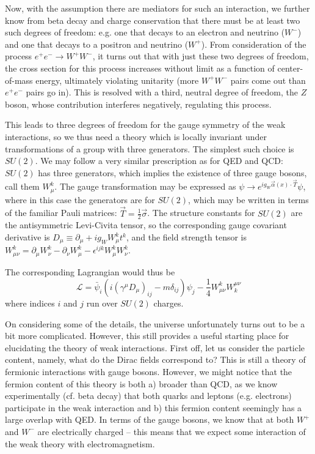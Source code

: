 Now, with the assumption there are mediators for such an interaction, we further know from beta decay and 
charge conservation that there must be at least two such degrees of freedom: e.g. one that decays to an electron 
and neutrino ($W^{-}$) and one that decays to a positron and neutrino ($W^{+}$). From consideration of the process 
$e^{+}e^{-}\rightarrow W^{+}W^{-}$, it turns out that with just these two degrees of freedom, the cross section for this process increases without limit as a function of center-of-mass energy, ultimately violating unitarity (more $W^{+}W^{-}$ 
pairs come out than $e^{+}e^{-}$ pairs go in). This is resolved with a third, neutral degree of freedom, the $Z$
boson, whose contribution interferes negatively, regulating this process.

This leads to three degrees of freedom for the gauge symmetry of the weak interactions, so we thus need a theory 
which is locally invariant under transformations of a group with three generators. The simplest such choice is $SU(2)$. 
We may follow a very similar prescription as for QED and QCD: $SU(2)$ has three generators, which implies the existence of 
three gauge bosons, call them $W_{\mu}^k$.  The gauge transformation may be expressed as $\psi \rightarrow e^{ig_{W}\vec{\alpha}(x)\cdot \vec{T}}\psi$, where in this case the generators are for $SU(2)$, which may be written in terms of the familiar
Pauli matrices: $\vec{T} = \frac{1}{2}\vec{\sigma}$. The structure constants for $SU(2)$ are the antisymmetric Levi-Civita 
tensor, so the corresponding gauge covariant derivative is
$D_{\mu} \equiv \partial_{\mu} + ig_{W}W_{\mu}^{k}t^{k}$, and the field strength tensor is 
$W_{\mu\nu}^{k} = \partial_{\mu}W_{\nu}^{k}-\partial_{\nu}W_{\mu}^{k}-\epsilon^{ijk}W_{\mu}^{k}W_{\nu}^{k}$.

The corresponding Lagrangian would thus be
\begin{equation}
\mathcal{L} = \bar{\psi}_{i}(i(\gamma^{\mu}D_{\mu})_{ij} - m\delta_{ij})\psi_{j} -\frac{1}{4} W_{\mu\nu}^{k}W^{\mu\nu}_{k}
\end{equation}
where indices $i$ and $j$ run over $SU(2)$ charges.

On considering some of the details, the universe unfortunately turns out to be a bit more complicated. However, this still
provides a useful starting place for elucidating the theory of weak interactions. First off, let us consider the 
particle content, namely, what do the Dirac fields correspond to? This is still a theory of fermionic interactions
with gauge bosons. However, we might notice that the fermion content of this theory is both a) broader than QCD, 
as we know experimentally (cf. beta decay) that both quarks and leptons (e.g. electrons) participate in the 
weak interaction and b) this fermion content seemingly has a large overlap with QED. In terms of the gauge bosons, 
we know that at both $W^{+}$ and $W^{-}$ are electrically charged -- this means that we expect some interaction of 
the weak theory with electromagnetism. 

